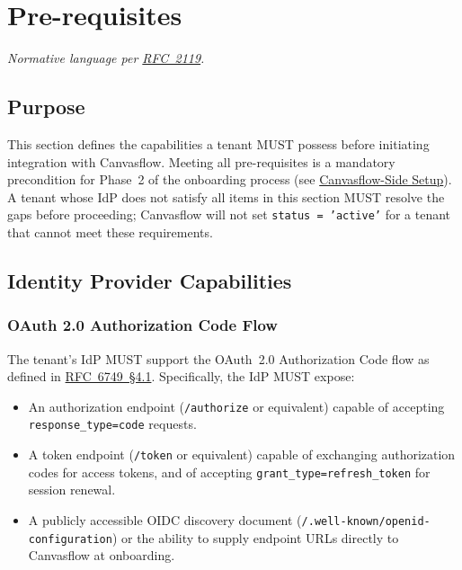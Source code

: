 \section{Pre-requisites}

\textit{Normative language per \href{https://tools.ietf.org/html/rfc2119}{RFC~2119}.}

\subsection{Purpose}

This section defines the capabilities a tenant MUST possess before initiating
integration with Canvasflow. Meeting all pre-requisites is a mandatory precondition for
Phase~2 of the onboarding process (see \hyperref[sec:canvasflow-side-setup]{Canvasflow-Side Setup}). 
A tenant whose IdP does not satisfy all items in this section MUST resolve the gaps 
before proceeding; Canvasflow will not set \texttt{status = 'active'} for a tenant 
that cannot meet these requirements.


\subsection{Identity Provider Capabilities}

\subsubsection{OAuth 2.0 Authorization Code Flow}

The tenant's IdP MUST support the OAuth~2.0 Authorization Code flow as defined in
\href{https://datatracker.ietf.org/doc/html/rfc6749#section-4.1}{RFC~6749~\S4.1}. 
Specifically, the IdP MUST expose:

\begin{itemize}
  \item An authorization endpoint (\texttt{/authorize} or equivalent) capable of
    accepting \linebreak \texttt{response\_type=code} requests.
  \item A token endpoint (\texttt{/token} or equivalent) capable of exchanging
    authorization codes for access tokens, and of accepting
    \texttt{grant\_type=refresh\_token} for session renewal.
  \item A publicly accessible OIDC discovery document
    \linebreak(\texttt{/.well-known/openid-configuration}) or the ability to supply endpoint
    URLs directly to Canvasflow at onboarding.
\end{itemize}

